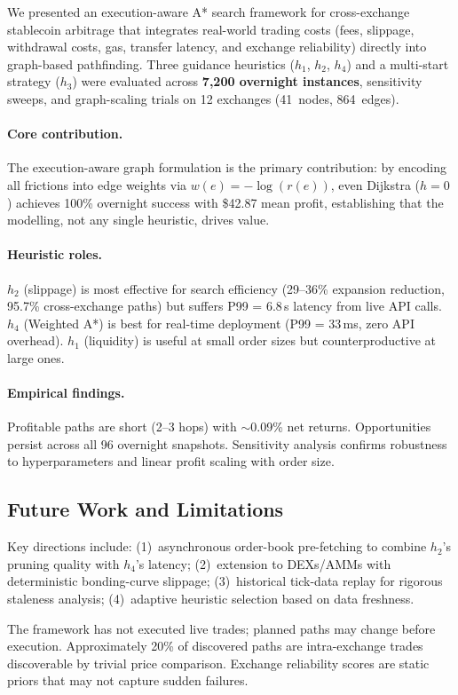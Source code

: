 We presented an execution-aware A* search framework for cross-exchange stablecoin arbitrage that integrates real-world trading costs (fees, slippage, withdrawal costs, gas, transfer latency, and exchange reliability) directly into graph-based pathfinding. Three guidance heuristics ($h_1$, $h_2$, $h_4$) and a multi-start strategy ($h_3$) were evaluated across \textbf{7{,}200 overnight instances}, sensitivity sweeps, and graph-scaling trials on 12 exchanges (41~nodes, 864~edges).

\paragraph{Core contribution.}
The execution-aware graph formulation is the primary contribution: by encoding all frictions into edge weights via $w(e)=-\log(r(e))$, even Dijkstra ($h{=}0$) achieves 100\% overnight success with \$42.87 mean profit, establishing that the modelling, not any single heuristic, drives value.

\paragraph{Heuristic roles.}
$h_2$ (slippage) is most effective for search efficiency (29--36\% expansion reduction, 95.7\% cross-exchange paths) but suffers P99 = 6.8\,s latency from live API calls. $h_4$ (Weighted A*) is best for real-time deployment (P99 = 33\,ms, zero API overhead). $h_1$ (liquidity) is useful at small order sizes but counterproductive at large ones.

\paragraph{Empirical findings.}
Profitable paths are short (2--3 hops) with $\sim$0.09\% net returns. Opportunities persist across all 96 overnight snapshots. Sensitivity analysis confirms robustness to hyperparameters and linear profit scaling with order size.

\subsection{Future Work and Limitations}

Key directions include: (1)~asynchronous order-book pre-fetching to combine $h_2$'s pruning quality with $h_4$'s latency; (2)~extension to DEXs/AMMs with deterministic bonding-curve slippage; (3)~historical tick-data replay for rigorous staleness analysis; (4)~adaptive heuristic selection based on data freshness.

The framework has not executed live trades; planned paths may change before execution. Approximately 20\% of discovered paths are intra-exchange trades discoverable by trivial price comparison. Exchange reliability scores are static priors that may not capture sudden failures.
